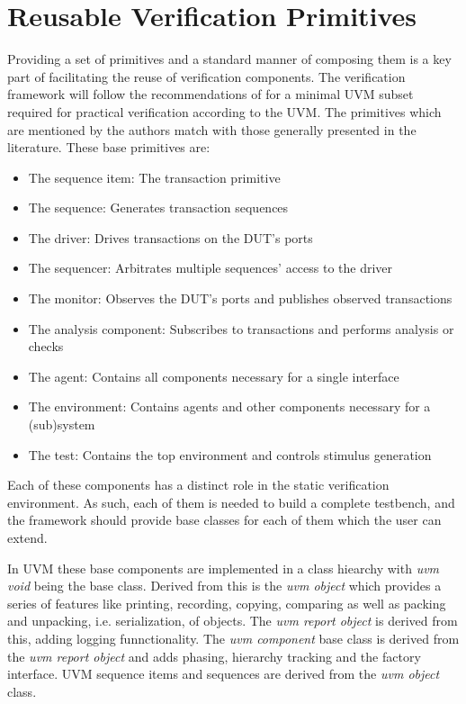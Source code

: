 \section{Reusable Verification Primitives} %

Providing a set of primitives and a standard manner of composing them is a key part of facilitating the reuse of
verification components. The verification framework will follow the recommendations of \citeauthor{sutherland2015uvm}
\cite{sutherland2015uvm} for a minimal UVM subset required for practical verification according to the UVM. The
primitives which are mentioned by the authors match with those generally presented in the literature. These base primitives are:

\begin{itemize}
  \item The sequence item: The transaction primitive
  \item The sequence: Generates transaction sequences
  \item The driver: Drives transactions on the DUT's ports
  \item The sequencer: Arbitrates multiple sequences' access to the driver
  \item The monitor: Observes the DUT's ports and publishes observed transactions
  \item The analysis component: Subscribes to transactions and performs analysis or checks
  \item The agent: Contains all components necessary for a single interface
  \item The environment: Contains agents and other components necessary for a (sub)system
  \item The test: Contains the top environment and controls stimulus generation
\end{itemize}

Each of these components has a distinct role in the static verification environment. As such, each of them is needed to build a complete testbench, and the framework should
provide base classes for each of them which the user can extend.

In UVM these base components are implemented in a class hiearchy with \textit{uvm void} being the base class. Derived
from this is the \textit{uvm object} which provides a series of features like printing, recording, copying, comparing
as well as packing and unpacking, i.e. serialization, of objects. The \textit{uvm report object} is derived from
this, adding logging funnctionality. The \textit{uvm component} base class is derived from the \textit{uvm report
object} and adds phasing, hierarchy tracking and the factory interface. UVM sequence items and sequences are derived
from the \textit{uvm object} class.

